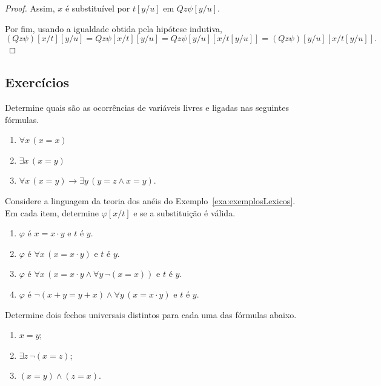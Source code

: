 \begin{proof}
    Assim, $x$ é substituível por $t[y/u]$ em $Qz\psi[y/u]$.

    Por fim, usando a igualdade obtida pela hipótese indutiva,
    \[
        (Qz\psi)[x/t][y/u]
        =
        Qz\psi[x/t][y/u]
        =
        Qz\psi[y/u][x/t[y/u]]
        =
        (Qz\psi)[y/u][x/t[y/u]].
    \]
\end{proof}
\subsection*{Exercícios}

\begin{exercise}\label{exr:variaveisLivresELigadas}
    Determine quais são as ocorrências de variáveis livres e ligadas nas seguintes fórmulas.
    \begin{enumerate}[label=(\alph*)]
        \item $\forall x \, (x = x)$
        \item $\exists x \, (x = y)$
        \item $\forall x \, (x = y) \rightarrow \exists y \, (y = z \wedge x=y)$.
    \end{enumerate}
\end{exercise}

\begin{exercise}\label{exr:substituicaoEmFormulas}
    Considere a linguagem da teoria dos anéis do Exemplo~\ref{exa:exemplosLexicos}.
    Em cada item, determine $\varphi[x/t]$ e se a substituição é válida.
    \begin{enumerate}[label=(\alph*)]
        \item $\varphi$ é $x = x \cdot y$ e $t$ é $y$.
        \item $\varphi$ é $\forall x \, (x = x \cdot y)$ e $t$ é $y$.
        \item $\varphi$ é $\forall x \, (x = x \cdot y \wedge \forall y\, \neg (x = x))$ e $t$ é $y$.
        \item $\varphi$ é $ \neg (x+y =y+x) \wedge \forall y \, (x = x \cdot y)$ e $t$ é $y$.
    \end{enumerate}
\end{exercise}

\begin{exercise}\label{exr:fechosUniversais}
    Determine dois fechos universais distintos para cada uma das fórmulas abaixo.
    \begin{enumerate}[label=(\alph*)]
        \item $x = y$;
        \item $\exists z\,\neg(x = z)$;
        \item $(x = y) \wedge (z = x)$.
    \end{enumerate}
\end{exercise}
